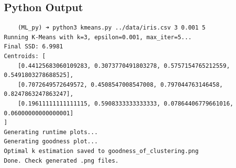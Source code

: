 \documentclass[12pt]{article}
\begin{document}
\subsection{Python Output}

\begin{verbatim}
    (ML_py) ➜ python3 kmeans.py ../data/iris.csv 3 0.001 5
Running K-Means with k=3, epsilon=0.001, max_iter=5...
Final SSD: 6.9981
Centroids: [
    [0.44125683060109283, 0.3073770491803278, 0.5757154765212559, 0.5491803278688525],
    [0.7072649572649572, 0.4508547008547008, 0.797044763146458, 0.8247863247863247],
    [0.19611111111111115, 0.5908333333333333, 0.07864406779661016, 0.06000000000000001]
]
Generating runtime plots...
Generating goodness plot...
Optimal k estimation saved to goodness_of_clustering.png
Done. Check generated .png files.
\end{verbatim}
\end{document}
